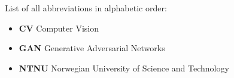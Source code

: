 
List of all abbreviations in alphabetic order:

\begin{itemize}

    \item \textbf{CV} Computer Vision
    \item \textbf{GAN} Generative Adversarial Networks
    \item \textbf{NTNU} Norwegian University of Science and Technology
    

    
\end{itemize}